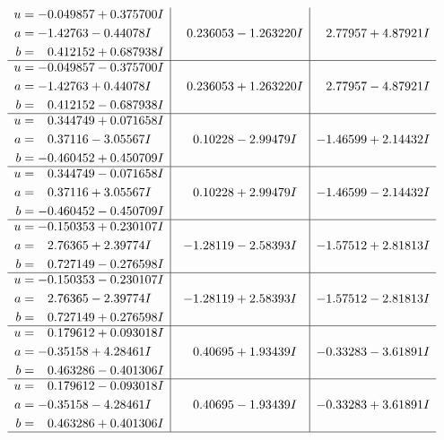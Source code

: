 \documentclass[1p]{elsarticle_modified}
\theoremstyle{definition}
\begin{document}
$$\begin{array}{c|c|c}
\begin{aligned}
u &= -0.049857 + 0.375700 I \\
a &= -1.42763 - 0.44078 I \\
b &= \phantom{-}0.412152 + 0.687938 I\end{aligned}
 & \phantom{-}0.236053 - 1.263220 I & \phantom{-}2.77957 + 4.87921 I \\ \hline\begin{aligned}
u &= -0.049857 - 0.375700 I \\
a &= -1.42763 + 0.44078 I \\
b &= \phantom{-}0.412152 - 0.687938 I\end{aligned}
 & \phantom{-}0.236053 + 1.263220 I & \phantom{-}2.77957 - 4.87921 I \\ \hline\begin{aligned}
u &= \phantom{-}0.344749 + 0.071658 I \\
a &= \phantom{-}0.37116 - 3.05567 I \\
b &= -0.460452 + 0.450709 I\end{aligned}
 & \phantom{-}0.10228 - 2.99479 I & -1.46599 + 2.14432 I \\ \hline\begin{aligned}
u &= \phantom{-}0.344749 - 0.071658 I \\
a &= \phantom{-}0.37116 + 3.05567 I \\
b &= -0.460452 - 0.450709 I\end{aligned}
 & \phantom{-}0.10228 + 2.99479 I & -1.46599 - 2.14432 I \\ \hline\begin{aligned}
u &= -0.150353 + 0.230107 I \\
a &= \phantom{-}2.76365 + 2.39774 I \\
b &= \phantom{-}0.727149 - 0.276598 I\end{aligned}
 & -1.28119 - 2.58393 I & -1.57512 + 2.81813 I \\ \hline\begin{aligned}
u &= -0.150353 - 0.230107 I \\
a &= \phantom{-}2.76365 - 2.39774 I \\
b &= \phantom{-}0.727149 + 0.276598 I\end{aligned}
 & -1.28119 + 2.58393 I & -1.57512 - 2.81813 I \\ \hline\begin{aligned}
u &= \phantom{-}0.179612 + 0.093018 I \\
a &= -0.35158 + 4.28461 I \\
b &= \phantom{-}0.463286 - 0.401306 I\end{aligned}
 & \phantom{-}0.40695 + 1.93439 I & -0.33283 - 3.61891 I \\ \hline\begin{aligned}
u &= \phantom{-}0.179612 - 0.093018 I \\
a &= -0.35158 - 4.28461 I \\
b &= \phantom{-}0.463286 + 0.401306 I\end{aligned}
 & \phantom{-}0.40695 - 1.93439 I & -0.33283 + 3.61891 I\\
 \hline 
 \end{array}$$\newpage\newpage\renewcommand{\arraystretch}{1}
\end{document}
